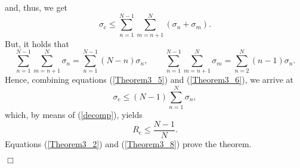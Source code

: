 \documentclass{article}
\begin{document}
%
and, thus, we get
%
\begin{equation}
    \label{Theorem3_5}
    \sigma_\mathrm{c}\leq\sum_{n=1}^{N-1}\sum_{m=n+1}^{N}\left(\sigma_n+\sigma_m\right).
\end{equation}
%
But, it holds that
%
\begin{equation}
    \label{Theorem3_6}
    \sum_{n=1}^{N-1}\sum_{m=n+1}^{N}\sigma_n=\sum_{n=1}^{N-1}(N-n)\sigma_n, \qquad \sum_{n=1}^{N-1}\sum_{m=n+1}^{N}\sigma_m=\sum_{n=2}^{N}(n-1)\sigma_n.
\end{equation}
%
Hence, combining equations (\ref{Theorem3_5}) and (\ref{Theorem3_6}), we arrive at
%
\begin{equation}
    \label{Theorem3_7}
    \sigma_\mathrm{c}\leq(N-1)\sum_{n=1}^{N}\sigma_n,
\end{equation}
%
which, by means of (\ref{decomp}), yields
%
\begin{equation}
    \label{Theorem3_8}
    R_\mathrm{c}\leq\frac{N-1}{N}.    
\end{equation}
%
Equations (\ref{Theorem3_2}) and (\ref{Theorem3_8}) prove the theorem.
%
\begin{flushright}$\Box$\end{flushright}
\end{document}

